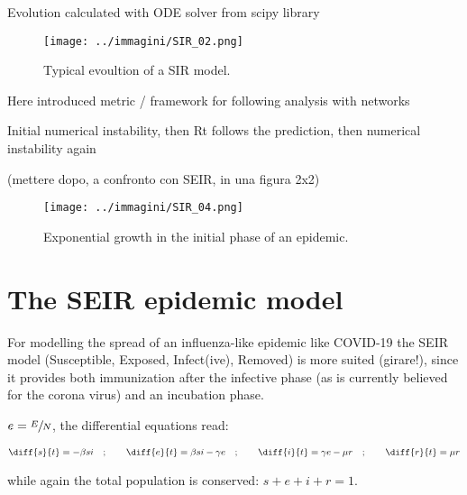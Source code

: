 \documentclass[DIV=12, BCOR=0pt]{scrartcl}  %
\begin{document}
  Evolution calculated with ODE solver from scipy library
  
  \begin{figure}[h]
  	\centering
  	\texttt{[image: ../immagini/SIR\_02.png]}
  	\caption{Typical evoultion of a SIR model. }
  	\label{fig:SIRtot}
  \end{figure}
%
  
  Here introduced metric / framework for following analysis with networks
  
  Initial numerical instability, then Rt follows the prediction, then numerical instability again
  
  (mettere dopo, a confronto con SEIR, in una figura 2x2)
 	
 \begin{figure}[h]
   \centering
   \texttt{[image: ../immagini/SIR\_04.png]}
   \caption{Exponential growth in the initial phase of an epidemic. }
   \label{fig:SIRr0}
 \end{figure}
  
  
  
  
  
  
  
  
  \section{The SEIR epidemic model}
  For modelling the spread of an influenza-like epidemic like COVID-19 the SEIR model (Susceptible, Exposed, Infect(ive), Removed) is more suited (girare!), since it provides both immunization after the infective phase (as is currently believed for the corona virus) and an incubation phase. 
  
 $e = \sfrac{E}{N}$,  the differential equations read:
  
  \begin{align}
  	\diff{s}{t} = - \beta s i \quad;  \qquad 	\diff{e}{t} = \beta s i - \gamma e \quad; \qquad \diff{i}{t} = \gamma e - \mu r \quad; \qquad \diff{r}{t} = \mu r
  \end{align}
  
  while again the total population is conserved: $s + e + i + r = 1$.
  
\end{document}
